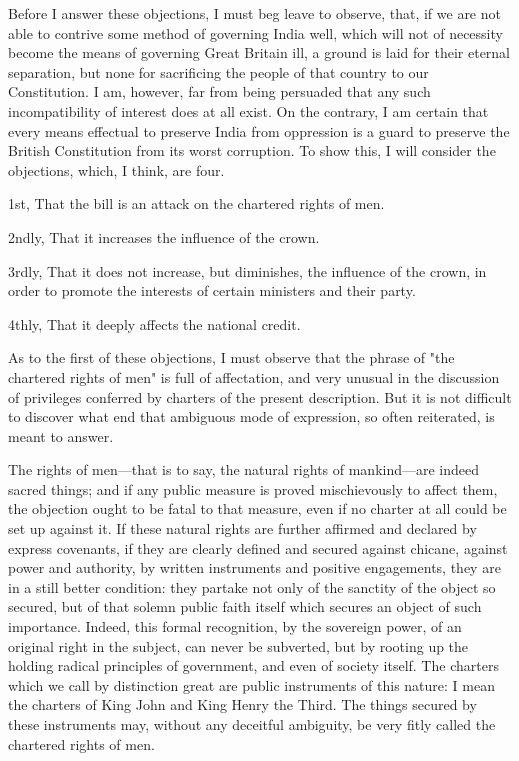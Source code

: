 Before I answer these objections, I must beg leave to observe, that, if we are not able to contrive some method of governing India well, which will not of necessity become the means of governing Great Britain ill, a ground is laid for their eternal separation, but none for sacrificing the people of that country to our Constitution. I am, however, far from being persuaded that any such incompatibility of interest does at all exist. On the contrary, I am certain that every means effectual to preserve India from oppression is a guard to preserve the British Constitution from its worst corruption. To show this, I will consider the objections, which, I think, are four.

1st, That the bill is an attack on the chartered rights of men.

2ndly, That it increases the influence of the crown.

3rdly, That it does not increase, but diminishes, the influence of the crown, in order to promote the interests of certain ministers and their party.

4thly, That it deeply affects the national credit.

As to the first of these objections, I must observe that the phrase of "the chartered rights of men" is full of affectation, and very unusual in the discussion of privileges conferred by charters of the present description. But it is not difficult to discover what end that ambiguous mode of expression, so often reiterated, is meant to answer.

The rights of men—that is to say, the natural rights of mankind—are indeed sacred things; and if any public measure is proved mischievously to affect them, the objection ought to be fatal to that measure, even if no charter at all could be set up against it. If these natural rights are further affirmed and declared by express covenants, if they are clearly defined and secured against chicane, against power and authority, by written instruments and positive engagements, they are in a still better condition: they partake not only of the sanctity of the object so secured, but of that solemn public faith itself which secures an object of such importance. Indeed, this formal recognition, by the sovereign power, of an original right in the subject, can never be subverted, but by rooting up the holding radical principles of government, and even of society itself. The charters which we call by distinction great are public instruments of this nature: I mean the charters of King John and King Henry the Third. The things secured by these instruments may, without any deceitful ambiguity, be very fitly called the chartered rights of men.

